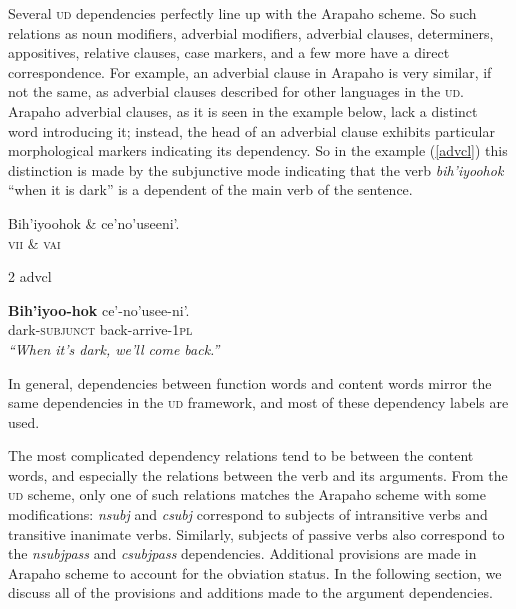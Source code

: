 \documentclass[11pt]{article}
\begin{document}
Several \textsc{ud} dependencies perfectly line up with the Arapaho scheme. So such relations as noun modifiers, adverbial modifiers, adverbial clauses, determiners, appositives, relative clauses, case markers, and a few more have a direct correspondence. For example, an adverbial clause in Arapaho is very similar, if not the same, as adverbial clauses described for other languages in the \textsc{ud}. Arapaho adverbial clauses, as it is seen in the example below, lack a distinct word introducing it; instead, the head of an adverbial clause exhibits particular morphological markers indicating its dependency. So in the example (\ref{advcl}) this distinction is made by the subjunctive mode indicating that the verb \textit{bih'iyoohok} ``when it is dark'' is a dependent of the main verb of the sentence.

\small
\begin{exe}
\ex \label{advcl} %
\begin{dependency}
\begin{deptext}
Bih'iyoohok \& ce'no'useeni'.\\
\textsc{vii} \& \textsc{vai}\\
\end{deptext}
	{2}	{advcl}
\end{dependency}
\gll \textbf{Bih'iyoo-hok} ce'-no'usee-ni'.\\
{dark-\textsc{subjunct}} {back-arrive-\textsc{1pl}}\\
\trans \textit{``When it's dark, we'll come back.''}
\end{exe}
\normalsize
In general, dependencies between function words and content words mirror the same dependencies in the \textsc{ud} framework, and most of these dependency labels are used. 

The most complicated dependency relations tend to be between the content words, and especially the relations between the verb and its arguments. From the \textsc{ud} scheme, only one of such relations matches the Arapaho scheme with some modifications: \textit{nsubj} and \textit{csubj} correspond to subjects of intransitive verbs and transitive inanimate verbs. Similarly, subjects of passive verbs also correspond to the \textit{nsubjpass} and \textit{csubjpass} dependencies. Additional provisions are made in Arapaho scheme to account for the obviation status. In the following section, we discuss all of the provisions and additions made to the argument dependencies.
\end{document}

